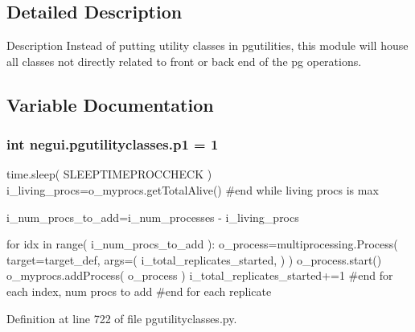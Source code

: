\subsection{Detailed Description}
\begin{DoxyVerb}Description
Instead of putting utility classes in pgutilities,
this module will house all classes not directly related
to front or back end of the pg operations.
\end{DoxyVerb}
 

\subsection{Variable Documentation}
\subsubsection[{\texorpdfstring{p1}{p1}}]{\setlength{\rightskip}{0pt plus 5cm}int negui.\+pgutilityclasses.\+p1 = 1}\hypertarget{namespacenegui_1_1pgutilityclasses_af03bb9226272b714c1db572575aa8a71}{}\label{namespacenegui_1_1pgutilityclasses_af03bb9226272b714c1db572575aa8a71}


time.\+sleep( S\+L\+E\+E\+P\+T\+I\+M\+E\+P\+R\+O\+C\+C\+H\+E\+C\+K ) i\+\_\+living\+\_\+procs=o\+\_\+myprocs.\+get\+Total\+Alive() \#end while living procs is max 

i\+\_\+num\+\_\+procs\+\_\+to\+\_\+add=i\+\_\+num\+\_\+processes -\/ i\+\_\+living\+\_\+procs

for idx in range( i\+\_\+num\+\_\+procs\+\_\+to\+\_\+add )\+: o\+\_\+process=multiprocessing.\+Process( target=target\+\_\+def, args=( i\+\_\+total\+\_\+replicates\+\_\+started, ) ) o\+\_\+process.\+start() o\+\_\+myprocs.\+add\+Process( o\+\_\+process ) i\+\_\+total\+\_\+replicates\+\_\+started+=1 \#end for each index, num procs to add \#end for each replicate 

Definition at line 722 of file pgutilityclasses.\+py.

